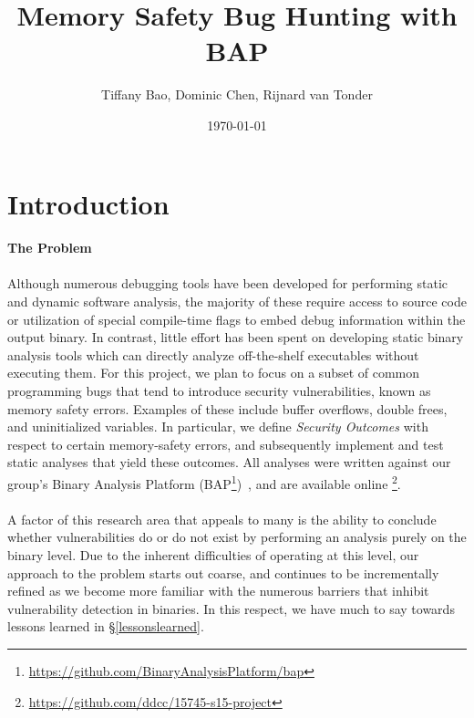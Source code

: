 \documentclass[letterpaper,11pt]{article}
\begin{document}
\date{\today}

\title{\Large \bf Memory Safety Bug Hunting with BAP}

\author{Tiffany Bao, Dominic Chen, Rijnard van Tonder}

\maketitle

\section{Introduction}
\label{intro}

\paragraph{The Problem}

\paragraph{}
Although numerous debugging tools have been developed for performing static and
dynamic software analysis, the majority of these require access to source
code or utilization of special compile-time flags to embed debug information
within the output binary. In contrast, little effort has been spent on
developing static binary analysis tools which can directly analyze
off-the-­shelf executables without executing them. For this project, we plan to
focus on a subset of common programming bugs that tend to introduce security
vulnerabilities, known as memory safety errors. Examples of these include
buffer overflows, double frees, and uninitialized variables. In particular, we
define \emph{Security Outcomes} with respect to certain memory-safety errors,
and subsequently implement and test static analyses that yield these outcomes.
All analyses were written against our group's Binary Analysis Platform
(BAP\footnote{\url{https://github.com/BinaryAnalysisPlatform/bap}})~\cite{bap, brumley2011bap},
and are available online \footnote{\url{https://github.com/ddcc/15745-s15-project}}.

\paragraph{}
A factor of this research area that appeals to many is the ability to
conclude whether vulnerabilities do or do not exist by performing
an analysis purely on the binary level. Due to the inherent difficulties
of operating at this level, %
our approach to the problem starts out coarse, and continues to be
incrementally refined as we become more familiar with the numerous
barriers that inhibit vulnerability detection in binaries. In this respect,
we have much to say towards lessons learned in \S\ref{lessonslearned}.
\end{document}
